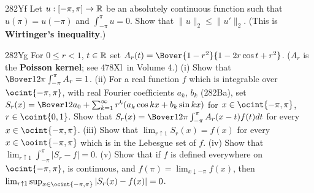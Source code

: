 {\spheader 282Yf Let $u:[-\pi,\pi]\to\Bbb R$ be an absolutely continuous
function such that $u(\pi)=u(-\pi)$ and $\int_{-\pi}^{\pi}u=0$.   Show
that $\|u\|_2\le\|u'\|_2$.   (This is {\bf Wirtinger's inequality}.)

\spheader 282Yg For $0\le r<1$, $t\in\Bbb R$ set
$A_r(t)=\Bover{1-r^2}{1-2r\cos t+r^2}$.
($A_r$ is the {\bf Poisson kernel};  see 478Xl\Latereditions\ in
Volume 4.)
(i) Show that $\Bover1{2\pi}\int_{-\pi}^{\pi}A_r=1$.
(ii) For a real function $f$ which is
integrable over $\ocint{-\pi,\pi}$, with real Fourier coefficients
$a_k$, $b_k$ (282Ba), set
$S_r(x)=\Bover12a_0+\sum_{k=1}^{\infty}r^k(a_k\cos kx+b_k\sin kx)$ for
$x\in\ocint{-\pi,\pi}$, $r\in\coint{0,1}$.   Show that
$S_r(x)=\Bover1{2\pi}\int_{-\pi}^{\pi}A_r(x-t)f(t)dt$ for every
$x\in\ocint{-\pi,\pi}$.   
(iii) Show that $\lim_{r\uparrow 1}S_r(x)=f(x)$ for every
$x\in\ooint{-\pi,\pi}$ which is in the Lebesgue set of $f$.
  (iv) Show that
$\lim_{r\uparrow 1}\int_{-\pi}^{\pi}|S_r-f|=0$.   (v) Show that if $f$ is
defined everywhere on $\ocint{-\pi,\pi}$, is continuous, and
$f(\pi)=\lim_{x\downarrow-\pi}f(x)$, then
$\lim_{r\uparrow 1}\sup_{x\in\ocint{-\pi,\pi}}|S_r(x)-f(x)|=0$.
}%

